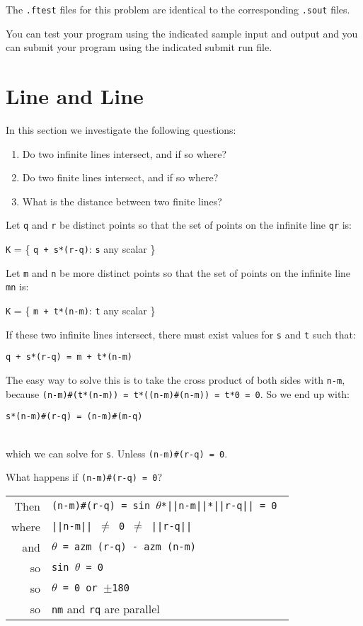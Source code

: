 \documentclass[12pt]{article}
\begin{document}
The {\tt .ftest} files for this problem are identical
to the corresponding {\tt .sout} files.

You can test your program using the indicated sample input and
output and you can submit your program using the indicated submit
run file.

\newpage


\section{Line and Line}
In this section we investigate the following questions:
\begin{enumerate}
\item Do two infinite lines intersect, and if so where?
\item Do two finite lines intersect, and if so where?
\item What is the distance between two finite lines?
\end{enumerate}

Let {\tt q} and {\tt r} be distinct points so that the set
of points on the infinite line {\tt qr} is: \\
\centerline{{\tt K} = \{ {\tt q + s*(r-q)}: {\tt s} any scalar \}} 

Let {\tt m} and {\tt n} be more distinct points so that the set
of points on the infinite line {\tt mn} is: \\
\centerline{{\tt K} = \{ {\tt m + t*(n-m)}: {\tt t} any scalar \}} 

If these two infinite lines intersect, there must exist values for
{\tt s} and {\tt t} such that: \\
\centerline{{\tt q + s*(r-q) = m + t*(n-m)}}

The easy way to solve this is to take the cross product of both
sides with {\tt n-m}, because
{\tt (n-m)\#(t*(n-m)) = t*((n-m)\#(n-m)) = t*0 = 0}.
So we end up with: \\
\centerline{\tt s*(n-m)\#(r-q) = (n-m)\#(m-q)} \\
which we can solve for {\tt s}.  Unless {\tt (n-m)\#(r-q) = 0}.

What happens if {\tt (n-m)\#(r-q) = 0}? \\
\hspace*{0.3in}\begin{tabular}{r@{~~}l}
Then    & \tt (n-m)\#(r-q) = sin $\theta$*||n-m||*||r-q|| = 0 \\
where   & \tt ||n-m|| $\neq$ 0 $\neq$ ||r-q|| \\
and     & \tt $\theta$ = azm (r-q) - azm (n-m) \\
so      & \tt sin $\theta$ = 0 \\
so      & \tt $\theta$ = 0 or $\pm$180 \\
so      & {\tt nm} and {\tt rq} are parallel \\
        \end{tabular}
\end{document}
